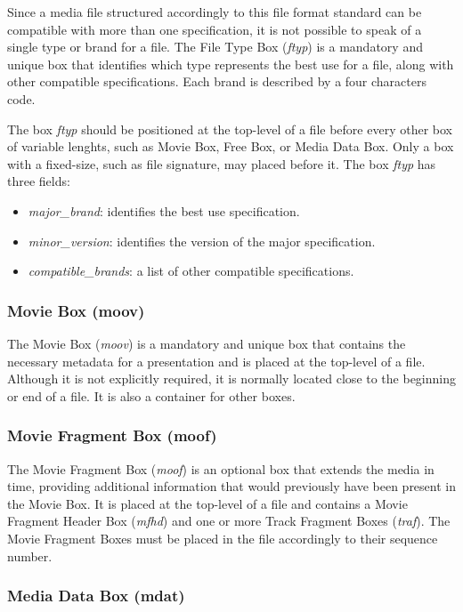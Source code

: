 Since a media file structured accordingly to this file format standard can be compatible with more than one specification, it is not possible to speak of a single type or brand for a file.
The File Type Box (\emph{ftyp}) is a mandatory and unique box that identifies which type represents the best use for a file, along with other compatible specifications. Each brand is described by a four characters code.

The box \emph{ftyp} should be positioned at the top-level of a file before every other box of variable lenghts, such as Movie Box, Free Box, or Media Data Box. Only a box with a fixed-size, such as file signature, may placed before it. The box \emph{ftyp} has three fields:

\begin{itemize}
\item \emph{major\_brand}: identifies the best use specification.
\item \emph{minor\_version}: identifies the version of the major specification.
\item \emph{compatible\_brands}: a list of other compatible specifications.
\end{itemize}

\subsubsection*{Movie Box (moov)}

The Movie Box (\emph{moov}) is a mandatory and unique box that contains the necessary metadata for a presentation and is placed at the top-level of a file. Although it is not explicitly required, it is normally located close to the beginning or end of a file. It is also a container for other boxes.

\subsubsection*{Movie Fragment Box (moof)}

The Movie Fragment Box (\emph{moof}) is an optional box that extends the media in time, providing additional information that would previously have been present in the Movie Box. It is placed at the top-level of a file and contains a Movie Fragment Header Box (\emph{mfhd}) and one or more Track Fragment Boxes (\emph{traf}). The Movie Fragment Boxes must be placed in the file accordingly to their sequence number.

\subsubsection*{Media Data Box (mdat)}

